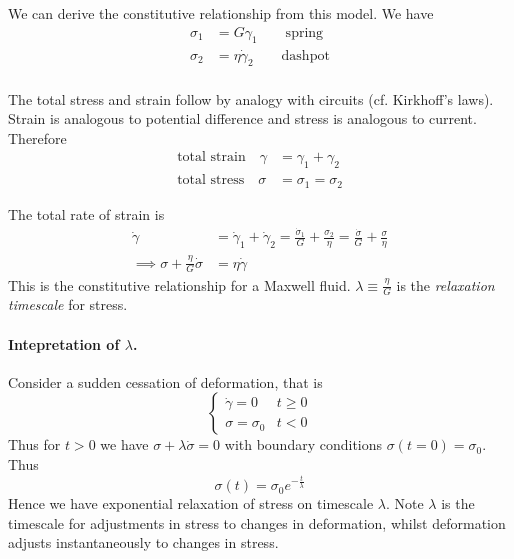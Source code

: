 \documentclass{jknotes}
\newcommand{\srate}{\dot{\gamma}}
\begin{document}
We can derive the constitutive relationship from this model. We have
\begin{align}
	\sigma_1 &= G \gamma_1 \hspace{2em} \text{spring}\\
	\sigma_2 &= \eta \srate_2 \hspace{2em} \text{dashpot} \\
\end{align}

The total stress and strain follow by analogy with circuits (cf. Kirkhoff's
laws). Strain is analogous to potential difference and stress is analogous to
current. Therefore
\begin{align}
	\text{total strain} \hspace{1em}  \gamma &= \gamma_1 + \gamma_2 \\
	\text{total stress}  \hspace{1em} \sigma &= \sigma_1 = \sigma_2
\end{align}

The total rate of strain is 
\begin{align}
	\dot{\gamma} &= \srate_1 + \srate_2 = \frac{\dot{\sigma}_1}{G} +
	\frac{\sigma_2}{\eta} = \frac{\dot{\sigma}}{G} + \frac{\sigma}{\eta}\\ 
	\implies \sigma + \frac{\eta}{G} \dot{\sigma} &= \eta \srate
\end{align}
This is the constitutive relationship for a Maxwell fluid. $\lambda \equiv
\frac{\eta}{G}$ is the \emph{relaxation timescale} for stress.

\paragraph{Intepretation of $\lambda$.} Consider a sudden cessation of
deformation, that is
\begin{equation}
	\begin{cases} \srate = 0 & t \ge 0 \\ \sigma = \sigma_0 & t < 0
	\end{cases}
\end{equation}
Thus for $t > 0$ we have $\sigma + \lambda \dot{\sigma} = 0$ with boundary
conditions $\sigma(t=0) = \sigma_0$. Thus
\begin{equation}
	\sigma(t) = \sigma_0 e^{-\frac{t}{\lambda}}
\end{equation}
Hence we have exponential relaxation of stress on timescale $\lambda$. Note
$\lambda$ is the timescale for adjustments in stress to changes in
deformation, whilst deformation adjusts instantaneously to changes in stress.
\end{document}
